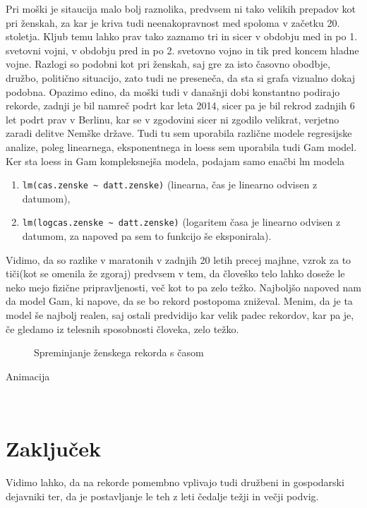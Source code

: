 \documentclass[11pt,a4paper]{article}
\begin{document}
Pri moški je sitaucija malo bolj raznolika, predvsem ni tako velikih prepadov kot pri ženskah, za kar je kriva tudi neenakopravnost med spoloma v začetku 20. stoletja. Kljub temu lahko prav tako zaznamo tri in sicer v obdobju med in po 1. svetovni vojni, v obdobju pred in po 2. svetovno vojno in tik pred koncem hladne vojne. Razlogi so podobni kot pri ženskah, saj gre za isto časovno obodbje, družbo, politično situacijo, zato tudi ne preseneča, da sta si grafa vizualno dokaj podobna. Opazimo edino, da moški tudi v današnji dobi konstantno podirajo rekorde, zadnji je bil namreč podrt kar leta 2014, sicer pa je bil rekrod zadnjih 6 let podrt prav v Berlinu, kar se v zgodovini sicer ni zgodilo velikrat, verjetno zaradi delitve Nemške države.
Tudi tu sem uporabila različne modele regresijske analize, poleg linearnega, eksponentnega in loess sem uporabila tudi Gam model. Ker sta loess in Gam kompleksnejša modela, podajam samo enačbi lm modela
\begin{enumerate}
\item{\verb|lm(cas.zenske ~ datt.zenske)| (linearna, čas je linearno odvisen z datumom),}
\item{\verb|lm(logcas.zenske ~ datt.zenske)| (logaritem časa je linearno odvisen z datumom, za napoved pa sem to funkcijo še eksponirala).}
\end{enumerate}
Vidimo, da so razlike v maratonih v zadnjih 20 letih precej majhne, vzrok za to tiči(kot se omenila že zgoraj) predvsem v tem, da človeško telo lahko doseže le neko mejo fizične pripravljenosti, več kot to pa zelo težko. Najboljšo napoved nam da model Gam, ki napove, da se bo rekord postopoma zniževal. Menim, da je ta model še najbolj realen, saj ostali predvidijo kar velik padec rekordov, kar pa je, če gledamo iz telesnih sposobnosti človeka, zelo težko.


\begin{figure}[H]
  \caption{Spreminjanje ženskega rekorda s časom}
  \label{fig:Slika 5}
\end{figure}

Animacija

\begin{center}
\\
\end{center}

\section{Zaključek}
Vidimo lahko, da na rekorde pomembno vplivajo tudi družbeni in gospodarski dejavniki ter, da je postavljanje le teh z leti čedalje težji in večji podvig.
\end{document}
